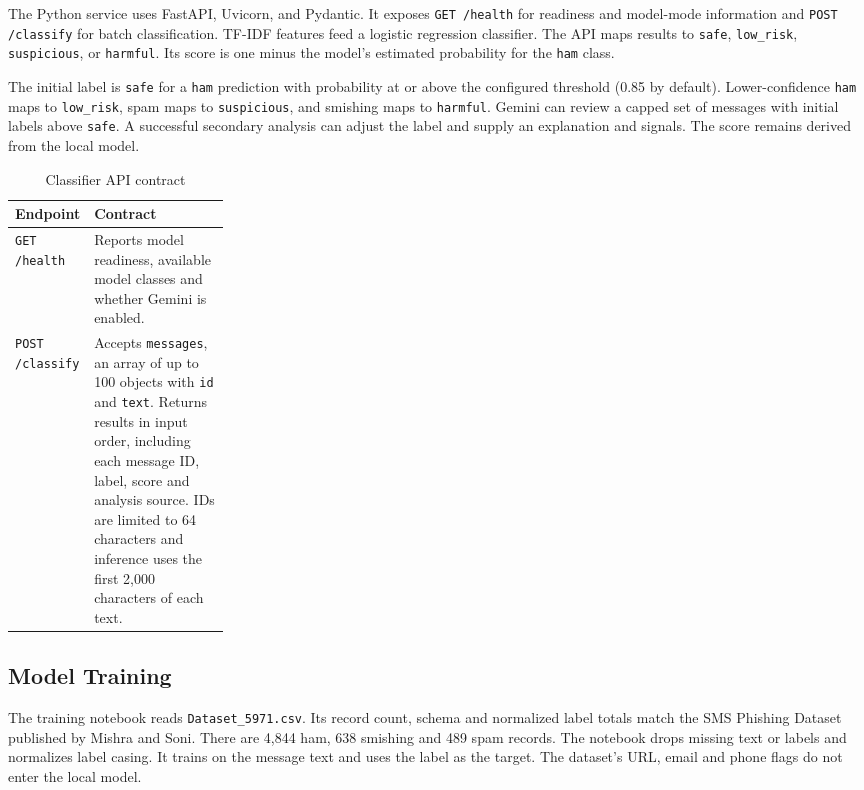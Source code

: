 \documentclass[12pt,letterpaper,twoside,openany]{book}
\begin{document}
The Python service uses FastAPI, Uvicorn, and Pydantic. It exposes \texttt{GET /health} for readiness and model-mode information and \texttt{POST /classify} for batch classification. TF-IDF features feed a logistic regression classifier. The API maps results to \texttt{safe}, \texttt{low\_risk}, \texttt{suspicious}, or \texttt{harmful}. Its score is one minus the model's estimated probability for the \texttt{ham} class.

The initial label is \texttt{safe} for a \texttt{ham} prediction with probability at or above the configured threshold (0.85 by default). Lower-confidence \texttt{ham} maps to \texttt{low\_risk}, spam maps to \texttt{suspicious}, and smishing maps to \texttt{harmful}. Gemini can review a capped set of messages with initial labels above \texttt{safe}. A successful secondary analysis can adjust the label and supply an explanation and signals. The score remains derived from the local model. \cite{integration}

\begin{table}[!htbp]
\centering
\small
\begin{tabularx}{\linewidth}{@{}p{0.25\linewidth}Y@{}}
\toprule
\textbf{Endpoint} & \textbf{Contract} \\
\midrule
\texttt{GET /health} & Reports model readiness, available model classes and whether Gemini is enabled. \\
\texttt{POST /classify} & Accepts \texttt{messages}, an array of up to 100 objects with \texttt{id} and \texttt{text}. Returns results in input order, including each message ID, label, score and analysis source. IDs are limited to 64 characters and inference uses the first 2,000 characters of each text. \\
\bottomrule
\end{tabularx}
\caption{Classifier API contract}
\label{tab:api-contract}
\end{table}

\subsection{Model Training}

The training notebook reads \texttt{Dataset\_5971.csv}. Its record count, schema and normalized label totals match the SMS Phishing Dataset published by Mishra and Soni. There are 4,844 ham, 638 smishing and 489 spam records. The notebook drops missing text or labels and normalizes label casing. It trains on the message text and uses the label as the target. The dataset's URL, email and phone flags do not enter the local model. \cite{notebook,dataset}
\end{document}
